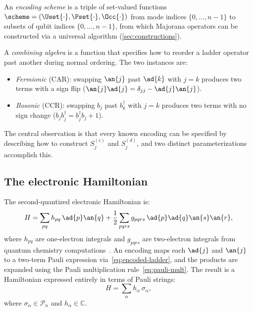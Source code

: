 \begin{definition}
\label{def:encoding-scheme}
An \emph{encoding scheme} is a triple of set-valued functions
$\scheme = (\Uset{\cdot}, \Pset{\cdot}, \Occ{\cdot})$ from mode
indices $\{0, \ldots, n{-}1\}$ to subsets of qubit indices
$\{0, \ldots, n{-}1\}$, from which Majorana operators can be
constructed via a universal algorithm (\cref{sec:constructions}).
\end{definition}

\begin{definition}
\label{def:combining-algebra}
A \emph{combining algebra} is a function that specifies how to
reorder a ladder operator past another during normal ordering.  The
two instances are:
\begin{itemize}
  \item \emph{Fermionic} (CAR): swapping $\an{j}$ past $\ad{k}$
    with $j = k$ produces two terms with a sign flip
    ($\an{j}\ad{j} = \delta_{jj} - \ad{j}\an{j}$).
  \item \emph{Bosonic} (CCR): swapping $b_j$ past $b_k^\dagger$
    with $j = k$ produces two terms with no sign change
    ($b_j b_j^\dagger = b_j^\dagger b_j + 1$).
\end{itemize}
\end{definition}

\noindent
The central observation is that every known encoding can be specified
by describing how to construct $S_j^{(c)}$ and $S_j^{(d)}$, and two
distinct parameterizations accomplish this.

\subsection{The electronic Hamiltonian}

The second-quantized electronic Hamiltonian is:
\begin{equation}
  H = \sum_{pq} h_{pq}\, \ad{p}\an{q}
    + \frac{1}{2} \sum_{pqrs} g_{pqrs}\, \ad{p}\ad{q}\an{s}\an{r},
  \label{eq:hamiltonian}
\end{equation}
where $h_{pq}$ are one-electron integrals and $g_{pqrs}$ are
two-electron integrals from quantum chemistry
computations~\cite{szabo1996, helgaker2000}.  An encoding maps each
$\ad{j}$ and $\an{j}$ to a two-term Pauli expression
via~\eqref{eq:encoded-ladder}, and the products are expanded using the
Pauli multiplication rule~\eqref{eq:pauli-mult}.  The result is a
Hamiltonian expressed entirely in terms of Pauli strings:
\begin{equation}
  H = \sum_{\alpha} h_\alpha\, \sigma_\alpha,
  \label{eq:pauli-hamiltonian}
\end{equation}
where $\sigma_\alpha \in \mathcal{P}_n$ and $h_\alpha \in \mathbb{C}$.
